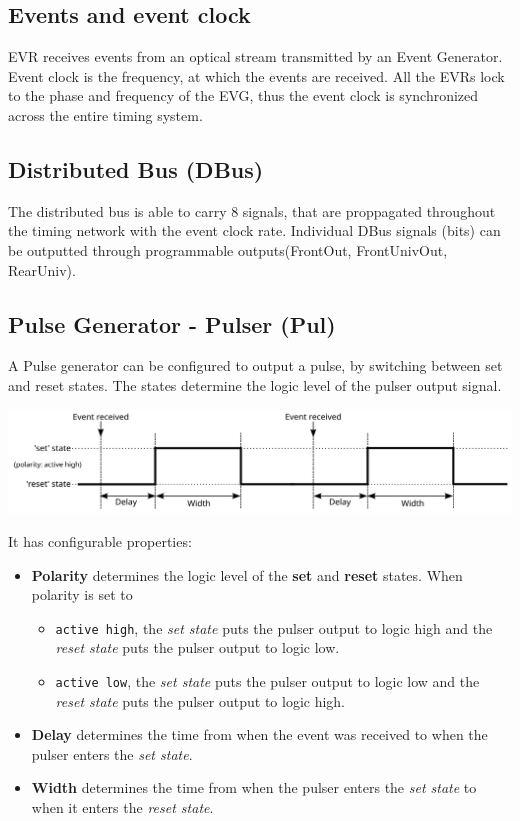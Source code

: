 \documentclass[12pt,a4paper]{article}
\begin{document}
\subsection{Events and event clock}
EVR receives events from an optical stream transmitted by an Event Generator. Event clock is the frequency, at which the events are received. All the EVRs lock to the phase and frequency of the EVG, thus the event clock is synchronized across the entire timing system.

\subsection{Distributed Bus (DBus)}
The distributed bus is able to carry 8 signals, that are proppagated throughout the timing network with the event clock rate. Individual DBus signals (bits) can be outputted through programmable outputs(FrontOut, FrontUnivOut, RearUniv). 

\subsection{Pulse Generator - Pulser (Pul)}
A Pulse generator can be configured to output a pulse, by switching between set and reset states. The states determine the logic level of the pulser output signal.

	\includegraphics[width=\columnwidth]{./img/pulserGeneric}

It has configurable properties:
\begin{itemize}
	\item \textbf{Polarity} determines the logic level of the \textbf{set} and \textbf{reset} states. When polarity is set to
	\begin{itemize}
		\item \texttt{active high}, the \textit{set state} puts the pulser output to logic high and the \textit{reset state} puts the pulser output to logic low. 
		\item \texttt{active low}, the \textit{set state} puts the pulser output to logic low and the \textit{reset state} puts the pulser output to logic high.
	\end{itemize}
	\item  \textbf{Delay} determines the time from when the event was received to when the pulser enters the \textit{set state}.
	\item  \textbf{Width} determines the time from when the pulser enters the \textit{set state} to when it enters the \textit{reset state}.
\end{itemize}
\end{document}
